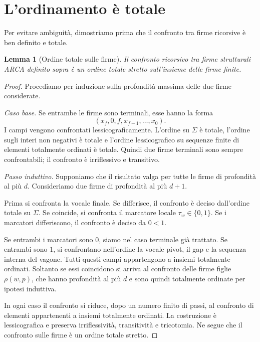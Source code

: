 \documentclass[11pt,a4paper]{article}
\newtheorem{lemma}[teorema]{Lemma}
\theoremstyle{definition}
\theoremstyle{remark}
\newcommand{\localSig}{\rho}
\newcommand{\Tag}{\tau_w}
\begin{document}
\section{L'ordinamento è totale}

Per evitare ambiguità, dimostriamo prima che il confronto tra firme ricorsive è ben definito e totale.

\begin{lemma}[Ordine totale sulle firme]
Il confronto ricorsivo tra firme strutturali ARCA definito sopra è un ordine totale stretto sull'insieme delle firme finite.
\end{lemma}

\begin{proof}
Procediamo per induzione sulla profondità massima delle due firme considerate.

\emph{Caso base.} Se entrambe le firme sono terminali, esse hanno la forma
\[
  (x_f,0,f,x_{f-1},\dots,x_0).
\]
I campi vengono confrontati lessicograficamente. L'ordine su $\Sigma$ è totale, l'ordine sugli interi non negativi è totale e l'ordine lessicografico su sequenze finite di elementi totalmente ordinati è totale. Quindi due firme terminali sono sempre confrontabili; il confronto è irriflessivo e transitivo.

\emph{Passo induttivo.} Supponiamo che il risultato valga per tutte le firme di profondità al più $d$. Consideriamo due firme di profondità al più $d+1$.

Prima si confronta la vocale finale. Se differisce, il confronto è deciso dall'ordine totale su $\Sigma$. Se coincide, si confronta il marcatore locale $\Tag\in\{0,1\}$. Se i marcatori differiscono, il confronto è deciso da $0<1$.

Se entrambi i marcatori sono $0$, siamo nel caso terminale già trattato. Se entrambi sono $1$, si confrontano nell'ordine la vocale pivot, il gap e la sequenza interna del vagone. Tutti questi campi appartengono a insiemi totalmente ordinati. Soltanto se essi coincidono si arriva al confronto delle firme figlie $\localSig(w,p)$, che hanno profondità al più $d$ e sono quindi totalmente ordinate per ipotesi induttiva.

In ogni caso il confronto si riduce, dopo un numero finito di passi, al confronto di elementi appartenenti a insiemi totalmente ordinati. La costruzione è lessicografica e preserva irriflessività, transitività e tricotomia. Ne segue che il confronto sulle firme è un ordine totale stretto.
\end{proof}
\end{document}

